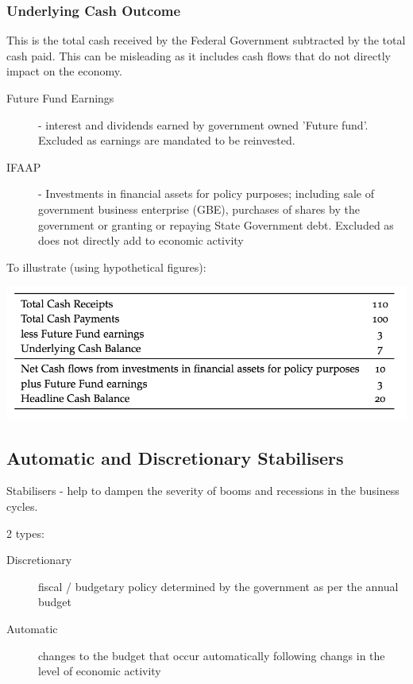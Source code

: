 \documentclass[11pt]{article}
\begin{document}
\subsubsection{Underlying Cash Outcome}
\label{sec-1-4-2}

This is the total cash received by the Federal Government subtracted
by the total cash paid. This can be misleading as it includes cash
flows that do not directly impact on the economy.

\begin{description}
\item[{Future Fund Earnings}] - interest and dividends earned by
government owned 'Future fund'. Excluded as earnings are mandated
to be reinvested.
\item[{IFAAP}] - Investments in financial assets for policy purposes;
including sale of government business enterprise (GBE),
purchases of shares by the government or granting or
repaying State Government debt. Excluded as does not
directly add to economic activity
\end{description}

To illustrate (using hypothetical figures):

\includegraphics[width=.9\linewidth]{./images/Cash_Outcome.png}

\subsection{Automatic and Discretionary Stabilisers}
\label{sec-1-5}

Stabilisers - help to dampen the severity of booms and recessions in the business cycles.

2 types: 

\begin{description}
\item[{Discretionary}] fiscal / budgetary policy determined by the
government as per the annual budget
\item[{Automatic}] changes to the budget that occur automatically following changs in the level of economic activity
\end{description}
\end{document}
